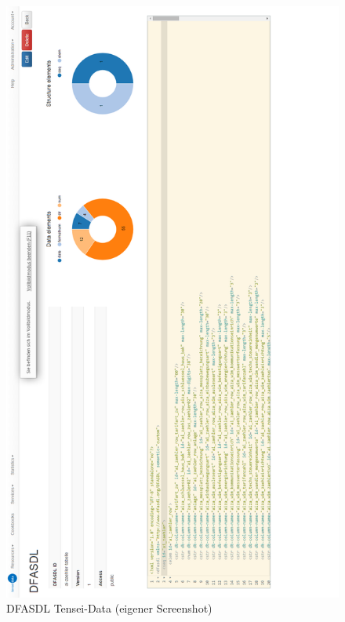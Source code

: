 \begin{figure}[ht]
	\begin{center}
		\includegraphics[scale=0.3]{bilder/dfasdl.png}
		\caption{DFASDL Tensei-Data (eigener Screenshot)}
		\label{pic:dfasdl:Tensei}
	\end{center}
\end{figure}


